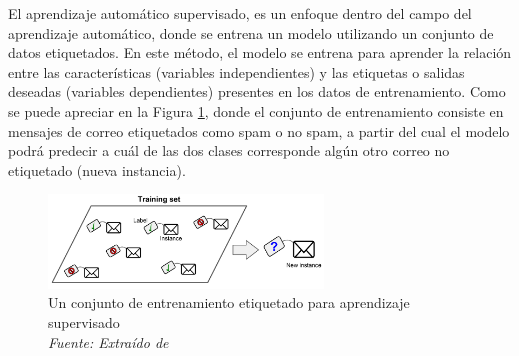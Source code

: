 El aprendizaje automático supervisado, es un enfoque dentro del campo del aprendizaje automático, donde se entrena un modelo utilizando un conjunto de datos etiquetados. En este método, el modelo se entrena para aprender la relación entre las características (variables independientes) y las etiquetas o salidas deseadas (variables dependientes) presentes en los datos de entrenamiento. Como se puede apreciar en la Figura \ref{fig:an8}, donde el conjunto de entrenamiento consiste en mensajes de correo etiquetados como spam o no spam, a partir del cual el modelo podrá predecir a cuál de las dos clases corresponde algún otro correo no etiquetado (nueva instancia). 

\begin{figure}[h!]
	\includegraphics[width=0.65\textwidth]{capitulo2/figuras/an8.png}
	\caption[Un conjunto de entrenamiento etiquetado para aprendizaje supervisado]{Un conjunto de entrenamiento etiquetado para aprendizaje supervisado
		\\\textit{Fuente: Extraído de} \protect\cite[p. 8]{geron2019hands} }
	\label{fig:an8}
\end{figure}